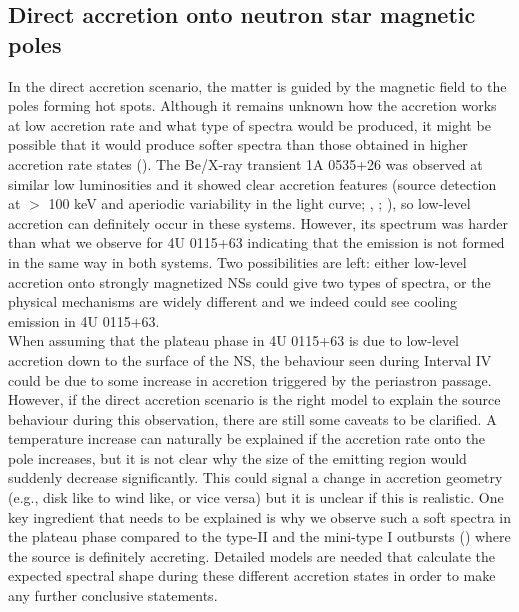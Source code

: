 \documentclass[a4paper,fleqn,usenatbib]{mnras}
\begin{document}
\subsection{Direct accretion onto neutron star magnetic poles}\label{subsec:accretion}
In the direct accretion scenario, the matter is guided by the magnetic field to the poles forming hot spots. Although it remains unknown how the accretion works at low accretion rate and what type of spectra would be produced, it might be possible that it would produce softer spectra than those obtained in higher accretion rate states (\citealt{Zampieri1995}). The Be/X-ray transient 1A 0535+26 was observed at similar low luminosities and it showed clear accretion features (source detection at $>$ 100 keV and aperiodic variability in the light curve; \citealt{Orlandini2004}, \citealt{Rothschild2013}; \citealt{Doroshenko2014}), so low-level accretion can definitely occur in these systems. However, its spectrum was harder than what we observe for 4U 0115+63 indicating that the emission is not formed in the same way in both systems. Two possibilities are left: either low-level accretion onto strongly magnetized NSs could give two types of spectra, or the physical mechanisms are widely different and we indeed could see cooling emission in 4U 0115+63.\\
\indent When assuming that the plateau phase in 4U 0115+63 is due to low-level accretion down to the surface of the NS, the behaviour seen during Interval IV could be due to some increase in accretion triggered by the periastron passage. However, if the direct accretion scenario is the right model to explain the source behaviour during this observation, there are still some caveats to be clarified. A temperature increase can naturally be explained if the accretion rate onto the pole increases, but it is not clear why the size of the emitting region would suddenly decrease significantly. This could signal a change in accretion geometry (e.g., disk like to wind like, or vice versa) but it is unclear if this is realistic. One key ingredient that needs to be explained is why we observe such a soft spectra in the plateau phase compared to the type-II and the mini-type I outbursts (\citealt{Wijnands2016}) where the source is definitely accreting. Detailed models are needed that calculate the expected spectral shape during these different accretion states in order to make any further conclusive statements.\\
\end{document}
